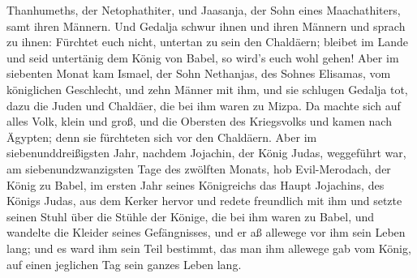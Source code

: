 Thanhumeths, der Netophathiter, und Jaasanja, der Sohn eines
Maachathiters, samt ihren Männern.  Und Gedalja schwur
ihnen und ihren Männern und sprach zu ihnen: Fürchtet euch nicht,
untertan zu sein den Chaldäern; bleibet im Lande und seid untertänig dem
König von Babel, so wird's euch wohl gehen!  Aber im
siebenten Monat kam Ismael, der Sohn Nethanjas, des Sohnes Elisamas, vom
königlichen Geschlecht, und zehn Männer mit ihm, und sie schlugen
Gedalja tot, dazu die Juden und Chaldäer, die bei ihm waren zu Mizpa.
 Da machte sich auf alles Volk, klein und groß, und die
Obersten des Kriegsvolks und kamen nach Ägypten; denn sie fürchteten
sich vor den Chaldäern.  Aber im siebenunddreißigsten
Jahr, nachdem Jojachin, der König Judas, weggeführt war, am
siebenundzwanzigsten Tage des zwölften Monats, hob Evil-Merodach, der
König zu Babel, im ersten Jahr seines Königreichs das Haupt Jojachins,
des Königs Judas, aus dem Kerker hervor  und redete
freundlich mit ihm und setzte seinen Stuhl über die Stühle der Könige,
die bei ihm waren zu Babel,  und wandelte die Kleider
seines Gefängnisses, und er aß allewege vor ihm sein Leben lang;
 und es ward ihm sein Teil bestimmt, das man ihm allewege
gab vom König, auf einen jeglichen Tag sein ganzes Leben lang.
